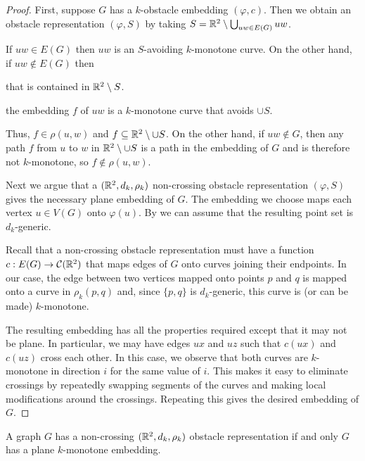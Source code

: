 \documentclass{patmorin}
\begin{document}
\begin{proof}
   First, suppose $G$ has a $k$-obstacle embedding $(\varphi,c)$.
   Then we obtain an obstacle representation $(\varphi,S)$ by taking $S=
   \mathbb{R}^2\setminus \bigcup_{uw\in E(G)} uw$.

   If $uw\in E(G)$ then $uw$ is an $S$-avoiding $k$-monotone curve.  On the other hand, if $uw\not\in E(G)$ then 



 that is contained in $\mathbb{R}^2\setminus S$.



the embedding $f$ of $uw$ is a $k$-monotone
   curve that avoids $\cup S$.  




Thus, $f\in\rho(u,w)$ and $f\subseteq
   \mathbb{R}^2\setminus{\cup S}$.  On the other hand, if $uw\not\in G$,
   then any path $f$ from $u$ to $w$ in $\mathbb{R}^2\setminus{\cup S}$ is
   a path in the embedding of $G$ and is therefore not $k$-monotone,
   so $f\not\in \rho(u,w)$.

   Next we argue that a $(\mathbb{R}^2,d_k,\rho_k)$ non-crossing obstacle
   representation $(\varphi, S)$ gives the necessary plane embedding
   of $G$.  The embedding we choose maps each vertex $u\in V(G)$ onto
   $\varphi(u)$.  By  we can assume that the resulting
   point set is $d_k$-generic.  

   Recall that a non-crossing obstacle representation must have a
   function $c:E(G)\to\mathcal{C}(\mathbb{R}^2)$ that maps edges of $G$ onto
   curves joining their endpoints.  In our case, the edge between two
   vertices mapped onto points $p$ and $q$ is mapped onto a curve in
   $\rho_k(p,q)$ and, since $\{p,q\}$ is $d_k$-generic, this curve is
   (or can be made) $k$-monotone.

   The resulting embedding has all the properties required except that
   it may not be plane.  In particular, we may have edges $ux$ and $uz$ 
   such that $c(ux)$ and $c(uz)$ cross each other.
   In this case, we observe that both
   curves are $k$-monotone in direction $i$ for the same value of $i$.
   This makes it easy to eliminate crossings by repeatedly swapping
   segments of the curves and making local modifications around the
   crossings.  Repeating this gives the desired embedding of $G$.
\end{proof}


\begin{cor}
   A graph $G$ has a non-crossing $(\mathbb{R}^2,d_k,\rho_k)$ obstacle
   representation if and only $G$ has a plane $k$-monotone embedding.
\end{cor}
\end{document}
